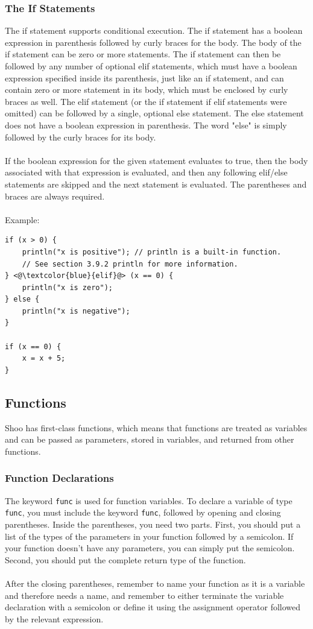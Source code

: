\documentclass[12pt]{article}
\begin{document}
\subsubsection{The If Statements}
The if statement supports conditional execution. The if statement has a boolean expression in parenthesis followed by curly braces for the body. The body of the if statement can be zero or more statements. The if statement can then be followed by any number of optional elif statements, which must have a boolean expression specified inside its parenthesis, just like an if statement, and can contain zero or more statement in its body, which must be enclosed by curly braces as well. The elif statement (or the if statement if elif statements were omitted) can be followed by a single, optional else statement. The else statement does not have a boolean expression in parenthesis. The word "else" is simply followed by the curly braces for its body.\\ \\
If the boolean expression for the given statement evaluates to true, then the body associated with that expression is evaluated, and then any following elif/else statements are skipped and the next statement is evaluated. The parentheses and braces are always required. \\
\\
Example:
\begin{lstlisting}
if (x > 0) {
	println("x is positive"); // println is a built-in function. 
	// See section 3.9.2 println for more information.
} <@\textcolor{blue}{elif}@> (x == 0) {
	println("x is zero");
} else {
	println("x is negative");
}

if (x == 0) {
    x = x + 5;
}
\end{lstlisting}

\subsection{Functions}
Shoo has first-class functions, which means that functions are treated as variables and can be passed as parameters, stored in variables, and returned from other functions. \\
\subsubsection{Function Declarations}
The keyword \lstinline!func! is used for function variables. To declare a variable of type \lstinline!func!, you must include the keyword \lstinline!func!, followed by opening and closing parentheses. Inside the parentheses, you need two parts. First, you should put a list of the types of the parameters in your function followed by a semicolon. If your function doesn't have any parameters, you can simply put the semicolon. Second, you should put the complete return type of the function.
\\ \\
After the closing parentheses, remember to name your function as it is a variable and therefore needs a name, and remember to either terminate the variable declaration with a semicolon or define it using the assignment operator followed by the relevant expression.
\end{document}
